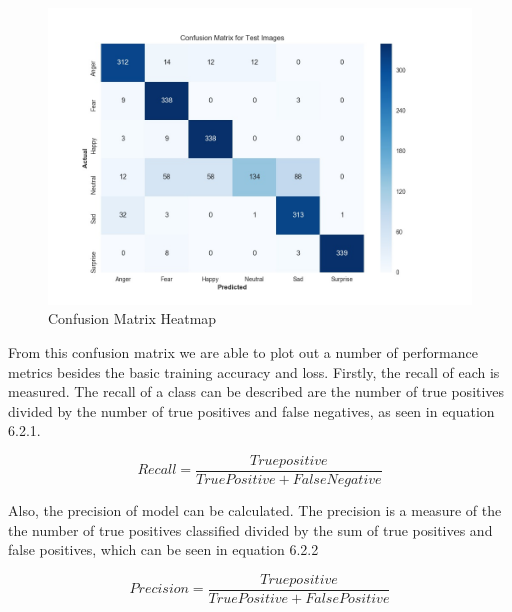 \begin{figure}[ht]
	\begin{center}
		\advance\leftskip-3cm
		\advance\rightskip-3cm
		\includegraphics[keepaspectratio=true,scale=0.5]{__resources/Results/confusion.jpg}
		\caption{Confusion Matrix Heatmap}
		\label{conf}
	\end{center}
\end{figure}
\newpage

From this confusion matrix we are able to plot out a number of performance metrics besides the basic training accuracy and loss. Firstly, the recall of each is measured. The recall of a class can be described are the number of true positives divided by the number of true positives and false negatives, as seen in equation 6.2.1. 

\begin{equation}\label{eq:recall}
Recall = 
\frac{
True positive
}{
True Positive + False Negative
}
\end{equation}

Also, the precision of model can be calculated. The precision is a measure of the the number of true positives classified divided by the sum of true positives and false positives, which can be seen in equation 6.2.2

\begin{equation}\label{eq:recall}
Precision = 
\frac{
	True positive
}{
	True Positive + False Positive
}
\end{equation}

